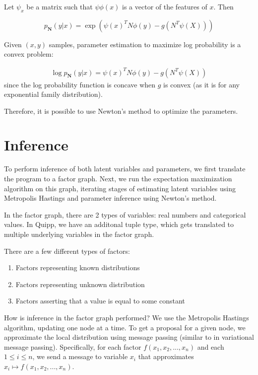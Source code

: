 \documentclass[proceed]{article}
\begin{document}
    Let $\psi_x$ be a matrix such that $\psi \phi(x)$ is a vector of the
    features of $x$.  Then

    $$p_{\mathbf{N}}(y | x) = \exp(\psi(x)^T N \phi(y) - g(N^T \psi(X)))$$

    Given $(x, y)$ samples, parameter estimation to maximize log probability is a convex
    problem:

    \begin{align*}
      \log p_{\mathbf{N}}(y | x) = \psi(x)^T N \phi(y) - g(N^T \psi(X))
    \end{align*}
    since the log probability function is concave when $g$ is convex (as it is
    for any exponential family distribution).

    Therefore, it is possible to use Newton's method to optimize the parameters.

  \section{Inference}

    To perform inference of both latent variables and parameters, we first
    translate the program to a factor graph.  Next, we run the
    expectation maximization algorithm on this graph, iterating stages of
    estimating latent variables using Metropolis Hastings and parameter
    inference using Newton's method.

    In the factor graph, there are 2 types of variables: real numbers
    and categorical values.
    In Quipp, we have an additonal tuple type, which gets translated
    to multiple underlying variables in the factor graph.

    There are a few different types of factors:
    \begin{enumerate}
      \item Factors representing known distributions
      \item Factors representing unknown distribution
      \item Factors asserting that a value is equal to some constant
    \end{enumerate}

    How is inference in the factor graph performed?  We use the Metropolis Hastings
    algorithm, updating one node at a time.  To get a proposal for a given node,
    we approximate the local distribution using message passing (similar to
    in variational message passing).  Specifically, for each factor
    $f(x_1, x_2, ..., x_n)$ and each $1 \leq i \leq n$, we send a message
    to variable $x_i$ that approximates $x_i \mapsto f(x_1, x_2, ..., x_n)$.
\end{document}
